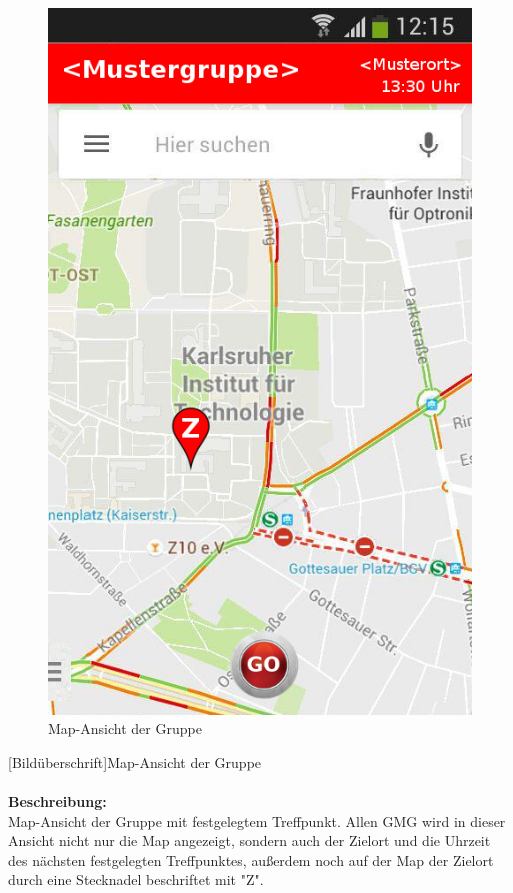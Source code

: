 \begin{figure}[H]
	\caption{Map-Ansicht der Gruppe}
\begin{center}
	\includegraphics[scale =0.5]{resources/images/map.png}
\end{center}
\end{figure}
[Bildüberschrift]Map-Ansicht der Gruppe\\ \\
\textbf{Beschreibung:}\\
Map-Ansicht der Gruppe mit festgelegtem Treffpunkt. Allen GMG wird in dieser Ansicht nicht nur die Map angezeigt, sondern auch der Zielort und die Uhrzeit des nächsten festgelegten Treffpunktes, außerdem noch auf der Map der Zielort durch eine Stecknadel beschriftet mit "Z".\\
